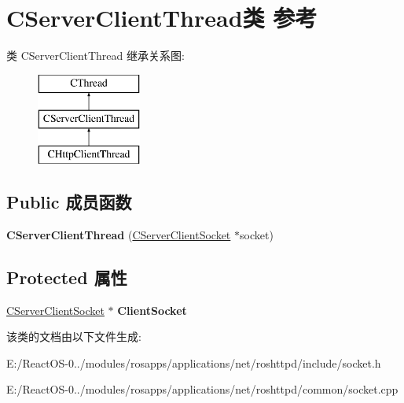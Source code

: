 \hypertarget{class_c_server_client_thread}{}\section{C\+Server\+Client\+Thread类 参考}
\label{class_c_server_client_thread}
类 C\+Server\+Client\+Thread 继承关系图\+:\begin{figure}[H]
\begin{center}
\leavevmode
\includegraphics[height=3.000000cm]{class_c_server_client_thread}
\end{center}
\end{figure}
\subsection*{Public 成员函数}
\begin{DoxyCompactItemize}
\item 
\mbox{\label{class_c_server_client_thread_abdcbbec3509305eb7e7c57755de7412b}} 
{\bfseries C\+Server\+Client\+Thread} (\hyperlink{class_c_server_client_socket}{C\+Server\+Client\+Socket} $\ast$socket)
\end{DoxyCompactItemize}
\subsection*{Protected 属性}
\begin{DoxyCompactItemize}
\item 
\mbox{\label{class_c_server_client_thread_aef90f6f9c543db1c629c337fb32497f0}} 
\hyperlink{class_c_server_client_socket}{C\+Server\+Client\+Socket} $\ast$ {\bfseries Client\+Socket}
\end{DoxyCompactItemize}


该类的文档由以下文件生成\+:\begin{DoxyCompactItemize}
\item 
E\+:/\+React\+O\+S-\/0../modules/rosapps/applications/net/roshttpd/include/socket.\+h\item 
E\+:/\+React\+O\+S-\/0../modules/rosapps/applications/net/roshttpd/common/socket.\+cpp\end{DoxyCompactItemize}

